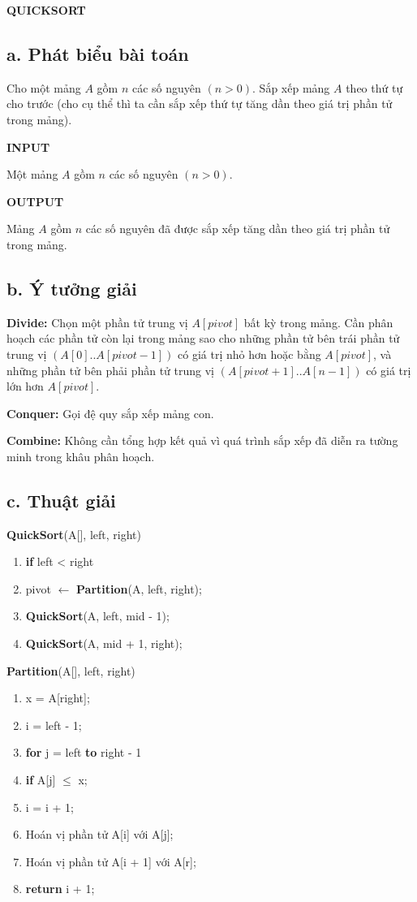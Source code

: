 \documentclass[12pt, a4paper, fleqn]{article}
\begin{document}
	
	\textbf{QUICKSORT}
	
	\subsection*{a. Phát biểu bài toán}
	Cho một mảng $A$ gồm $n$ các số nguyên $(n > 0)$. Sắp xếp mảng $A$ theo thứ tự cho trước (cho cụ thể thì ta cần sắp xếp thứ tự tăng dần theo giá trị phần tử trong mảng).
	
	\textbf{INPUT}
	
	Một mảng $A$ gồm $n$ các số nguyên $(n > 0)$.
	
	\textbf{OUTPUT}
	
	Mảng $A$ gồm $n$ các số nguyên đã được sắp xếp tăng dần theo giá trị phần tử trong mảng.
	
	\subsection*{b. Ý tưởng giải}
	
	\textbf{Divide:} Chọn một phần tử trung vị $A[pivot]$ bất kỳ trong mảng. Cần phân hoạch các phần tử còn lại trong mảng sao cho những phần tử bên trái phần tử trung vị $(A[0]..A[pivot - 1])$ có giá trị nhỏ hơn hoặc bằng $A[pivot]$, và những phần tử bên phải phần tử trung vị $(A[pivot + 1]..A[n - 1])$ có giá trị lớn hơn $A[pivot]$.
	
	\textbf{Conquer:} Gọi đệ quy sắp xếp mảng con.
	
	\textbf{Combine:} Không cần tổng hợp kết quả vì quá trình sắp xếp đã diễn ra tường minh trong khâu phân hoạch.
	
	\subsection*{c. Thuật giải}
	
	{  \selectfont
		\textbf{QuickSort}(A[], left, right)
		\begin{enumerate}
			\item \textbf{if} left < right
			\item \qquad pivot $\leftarrow$ \textbf{Partition}(A, left, right);
			\item \qquad \textbf{QuickSort}(A, left, mid - 1);
			\item \qquad \textbf{QuickSort}(A, mid + 1, right);
		\end{enumerate}
	
		\textbf{Partition}(A[], left, right)
		\begin{enumerate}
			\item x = A[right];
			\item i = left - 1;
			\item \textbf{for} j = left \textbf{to} right - 1
			\item \qquad \textbf{if} A[j] $\leq$ x;
			\item \qquad \qquad i = i + 1;
			\item \qquad \qquad Hoán vị phần tử A[i] với A[j];
			\item Hoán vị phần tử A[i + 1] với A[r];
			\item \textbf{return} i + 1;
		\end{enumerate}
	}
\end{document}
